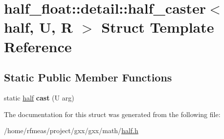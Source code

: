 \hypertarget{structhalf__float_1_1detail_1_1half__caster_3_01half_00_01U_00_01R_01_4}{}\section{half\+\_\+float\+:\+:detail\+:\+:half\+\_\+caster$<$ half, U, R $>$ Struct Template Reference}
\label{structhalf__float_1_1detail_1_1half__caster_3_01half_00_01U_00_01R_01_4}
\subsection*{Static Public Member Functions}
\begin{DoxyCompactItemize}
\item 
static \hyperlink{classhalf__float_1_1half}{half} {\bfseries cast} (U arg)\hypertarget{structhalf__float_1_1detail_1_1half__caster_3_01half_00_01U_00_01R_01_4_aa32ee58e119cf3e82017c420893c3adb}{}\label{structhalf__float_1_1detail_1_1half__caster_3_01half_00_01U_00_01R_01_4_aa32ee58e119cf3e82017c420893c3adb}

\end{DoxyCompactItemize}


The documentation for this struct was generated from the following file\+:\begin{DoxyCompactItemize}
\item 
/home/rfmeas/project/gxx/gxx/math/\hyperlink{half_8h}{half.\+h}\end{DoxyCompactItemize}
